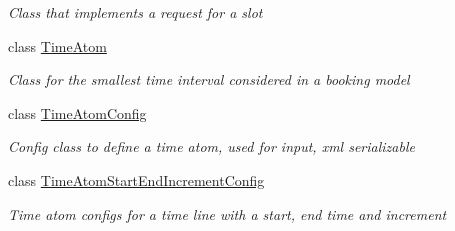 \begin{DoxyCompactItemize}
\begin{DoxyCompactList}\small\item\em Class that implements a request for a slot \end{DoxyCompactList}\item 
class \hyperlink{class_general_health_care_elements_1_1_booking_models_1_1_time_atom}{Time\+Atom}
\begin{DoxyCompactList}\small\item\em Class for the smallest time interval considered in a booking model \end{DoxyCompactList}\item 
class \hyperlink{class_general_health_care_elements_1_1_booking_models_1_1_time_atom_config}{Time\+Atom\+Config}
\begin{DoxyCompactList}\small\item\em Config class to define a time atom, used for input, xml serializable \end{DoxyCompactList}\item 
class \hyperlink{class_general_health_care_elements_1_1_booking_models_1_1_time_atom_start_end_increment_config}{Time\+Atom\+Start\+End\+Increment\+Config}
\begin{DoxyCompactList}\small\item\em Time atom configs for a time line with a start, end time and increment \end{DoxyCompactList}\end{DoxyCompactItemize}

